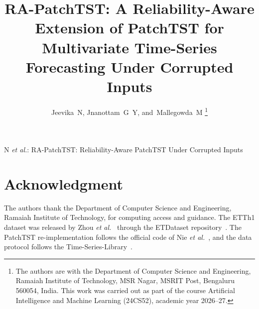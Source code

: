 \documentclass[journal]{IEEEtran}
\begin{document}
\title{RA-PatchTST: A Reliability-Aware Extension of PatchTST for Multivariate Time-Series Forecasting Under Corrupted Inputs}

\author{Jeevika~N,
        Jnanottam~G~Y,
        and~Mallegowda~M%
\thanks{The authors are with the Department of Computer Science and Engineering, Ramaiah Institute of Technology, MSR Nagar, MSRIT Post, Bengaluru 560054, India. This work was carried out as part of the course Artificial Intelligence and Machine Learning (24CS52), academic year 2026--27.}}

%
{N \MakeLowercase{\textit{et al.}}: RA-PatchTST: Reliability-Aware PatchTST Under Corrupted Inputs}

\maketitle













\section*{Acknowledgment}
The authors thank the Department of Computer Science and Engineering, Ramaiah Institute of Technology, for computing access and guidance. The ETTh1 dataset was released by Zhou \textit{et al.}~\cite{informer} through the ETDataset repository~\cite{ettdata}. The PatchTST re-implementation follows the official code of Nie \textit{et al.}~\cite{patchtst_code}, and the data protocol follows the Time-Series-Library~\cite{tslib_code}.




\appendices

\end{document}
